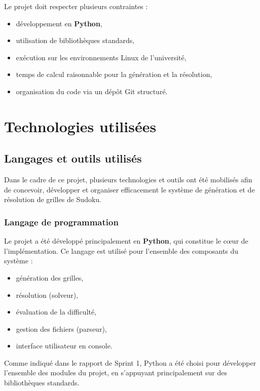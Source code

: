 \documentclass[a4paper]{article}
\begin{document}
Le projet doit respecter plusieurs contraintes :
\begin{itemize}
    \item développement en \textbf{Python},
    \item utilisation de bibliothèques standards,
    \item exécution sur les environnements Linux de l’université,
    \item temps de calcul raisonnable pour la génération et la résolution,
    \item organisation du code via un dépôt Git structuré.
\end{itemize}


\section{Technologies utilisées}

\subsection{Langages et outils utilisés}

Dans le cadre de ce projet, plusieurs technologies et outils ont été mobilisés afin de concevoir, développer et organiser efficacement le système de génération et de résolution de grilles de Sudoku.

\subsubsection{Langage de programmation}

Le projet a été développé principalement en \textbf{Python}, qui constitue le cœur de l’implémentation. Ce langage est utilisé pour l’ensemble des composants du système :
\begin{itemize}
    \item génération des grilles,
    \item résolution (solveur),
    \item évaluation de la difficulté,
    \item gestion des fichiers (parseur),
    \item interface utilisateur en console.
\end{itemize}

Comme indiqué dans le rapport de Sprint 1, Python a été choisi pour développer l’ensemble des modules du projet, en s’appuyant principalement sur des bibliothèques standards.
\end{document}
